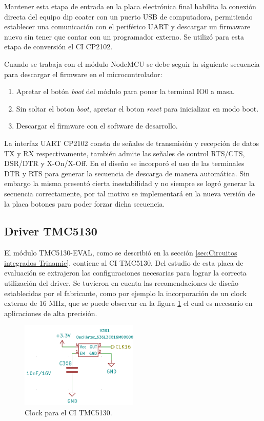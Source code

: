 Mantener esta etapa de entrada en la placa electrónica final habilita la conexión directa del equipo dip coater con un puerto USB de computadora, permitiendo establecer una comunicación con el periférico UART y descargar un firmaware nuevo sin tener que contar con un programador externo. Se utilizó para esta etapa de conversión el CI CP2102.

Cuando se trabaja con el módulo NodeMCU se debe seguir la siguiente secuencia para descargar el firmware en el microcontrolador:
\begin{enumerate}
\item Apretar el botón \textit{boot} del módulo para poner la terminal IO0 a masa.
\item Sin soltar el boton \textit{boot}, apretar el boton \textit{reset} para inicializar en modo boot.
\item Descargar el firmware con el software de desarrollo. 
\end{enumerate}

La interfaz UART CP2102 consta de señales de transmisión y recepción de datos TX y RX respectivamente, también admite las señales de control RTS/CTS, DSR/DTR y X-On/X-Off. En el diseño se incorporó el uso de las terminales DTR y RTS para generar la secuencia de descarga de manera automática. Sin embargo la misma presentó cierta inestabilidad y no siempre se logró generar la secuencia correctamente, por tal motivo se implementará en la nueva versión de la placa botones para poder forzar dicha secuencia.



\subsection{Driver TMC5130}

El módulo TMC5130-EVAL, como se describió en la sección \ref{sec:Circuitos integrados Trinamic}, contiene al CI TMC5130. Del estudio de esta placa de evaluación se extrajeron las configuraciones necesarias para lograr la correcta utilización del driver. Se tuvieron en cuenta las recomendaciones de diseño establecidas por el fabricante, como por ejemplo la incorporación de un clock externo de 16 MHz, que se puede observar en la figura \ref{fig:kicad_clock} el cual es necesario en aplicaciones de alta precisión. 

\begin{figure}[!h]
	\centering
	\includegraphics[width=0.5\textwidth]{./Figures/kicad_clock.png}
	\caption{Clock para el CI TMC5130.}
	\label{fig:kicad_clock}
\end{figure}

